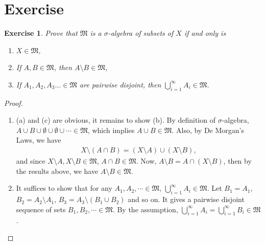 \documentclass[11pt]{book}
\newtheorem{exercise}{Exercise}[chapter]
\theoremstyle{definition}
\numberwithin{equation}{chapter}
\def\MM{\mathfrak{M}}
\begin{document}
\medskip

\section{Exercise}
\setcounter{exercise}{0}

\begin{exercise}
Prove that $\MM$ is a $\sigma$-algebra of subsets of $X$ if and only is
\begin{enumerate}
    \item[(a)] $X\in\MM$,
    
    \item[(b)] If $A,B\in\MM$, then $A\setminus B\in \MM$,
    
    \item[(c)] If $A_1,A_2,A_3\ldots\in\MM$ are pairwise disjoint, then $\bigcup_{i=1}^\infty A_i\in\MM$.
\end{enumerate}
\end{exercise}
\begin{proof} 
~\begin{enumerate}
    \item[($\Rightarrow$)] (a) and (c) are obvious, it remains to show (b). By definition of $\sigma$-algebra, $A \cup B \cup \emptyset \cup \emptyset \cup \cdots \in \mathfrak{M}$, which implies $A \cup B \in \mathfrak{M}$. Also, by De Morgan's Laws, we have 
    \begin{align*}
        X \setminus (A \cap B) = (X \setminus A) \cup (X \setminus B),
    \end{align*}
    and since $X \setminus A, X \setminus B \in \mathfrak{M}$, $A \cap B \in \mathfrak{M}$. Now, $A \setminus B = A \cap (X \setminus B)$, then by the results above, we have $A \setminus B \in \mathfrak{M}$.
    
    \item[($\Leftarrow$)] It suffices to show that for any $A_1, A_2,\cdots \in \mathfrak{M}$, $\bigcup^\infty_{i=1}A_i \in \mathfrak{M}$. Let $B_1 = A_1$, $B_2 = A_2 \setminus A_1$, $B_3 = A_3 \setminus (B_1 \cup B_2)$ and so on. It gives a pairwise disjoint sequence of sets $B_1, B_2, \cdots \in \mathfrak{M}$. By the assumption, $\bigcup^\infty_{i=1}A_i = \bigcup^\infty_{i=1}B_i \in \mathfrak{M}$.
\end{enumerate}
\end{proof}

\medskip
\end{document}
